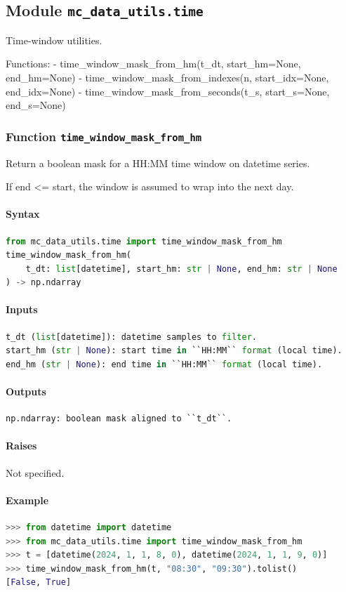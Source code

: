 \documentclass[11pt]{article}
\begin{document}
\subsection{Module \texttt{mc\_data\_utils.time}}
Time-window utilities.

Functions:
- time\_window\_mask\_from\_hm(t\_dt, start\_hm=None, end\_hm=None)
- time\_window\_mask\_from\_indexes(n, start\_idx=None, end\_idx=None)
- time\_window\_mask\_from\_seconds(t\_s, start\_s=None, end\_s=None)

\subsubsection{Function \texttt{time\_window\_mask\_from\_hm}}
Return a boolean mask for a HH:MM time window on datetime series.

If end <= start, the window is assumed to wrap into the next day.

\paragraph{Syntax}
\begin{lstlisting}[language=Python]
from mc_data_utils.time import time_window_mask_from_hm
time_window_mask_from_hm(
    t_dt: list[datetime], start_hm: str | None, end_hm: str | None
) -> np.ndarray
\end{lstlisting}
\paragraph{Inputs}
\begin{lstlisting}[language=Python]
t_dt (list[datetime]): datetime samples to filter.
start_hm (str | None): start time in ``HH:MM`` format (local time).
end_hm (str | None): end time in ``HH:MM`` format (local time).
\end{lstlisting}
\paragraph{Outputs}
\begin{lstlisting}[language=Python]
np.ndarray: boolean mask aligned to ``t_dt``.
\end{lstlisting}
\paragraph{Raises}
Not specified.
\paragraph{Example}
\begin{lstlisting}[language=Python]
>>> from datetime import datetime
>>> from mc_data_utils.time import time_window_mask_from_hm
>>> t = [datetime(2024, 1, 1, 8, 0), datetime(2024, 1, 1, 9, 0)]
>>> time_window_mask_from_hm(t, "08:30", "09:30").tolist()
[False, True]
\end{lstlisting}
\end{document}
